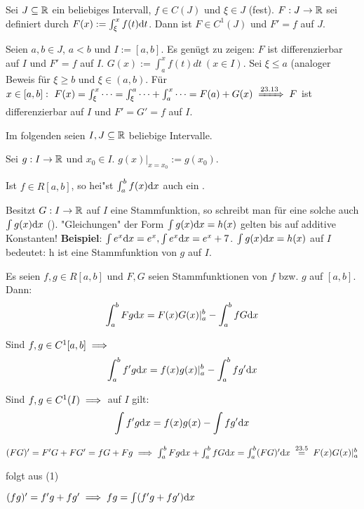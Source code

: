 \documentclass[a4paper,oneside,DIV15,BCOR12mm]{scrbook}
\begin{document}
\begin{satz}
Sei $J \subseteq \mathbb{R}$ ein beliebiges Intervall, $f \in C(J)$ und $\xi \in J$ (fest). $F:J\to\mathbb{R}$ sei definiert durch $F(x):=\int_{\xi}^xf(t)\text{d}t$. Dann ist $F\in C^1(J)$ und $F'=f$ auf $J$. 
\end{satz}


\begin{beweis}
Seien $a,b \in J$, $a<b$ und $I:=[a,b]$. Es genügt zu zeigen: $F$ ist differenzierbar auf $I$ und $F'=f$ auf $I$. $G(x):=\int_a^xf(t)dt\ (x\in I)$. Sei $\xi\le a$ (analoger Beweis für $\xi\ge b$ und $\xi \in (a,b)$. Für $x \in [a,b]:\ F(x)=\int_{\xi}^x\cdots = \int_{\xi}^a\cdots + \int_a^x\cdots=F(a)+G(x)\folgtnach{23.13} F$ ist differenzierbar auf $I$ und $F'=G'=f$ auf $I$.
\end{beweis}

\begin{definition}
Im folgenden seien $I,J\subseteq\mathbb{R}$ beliebige Intervalle.
\begin{liste}
\item Sei $g:I\to\mathbb{R}$ und $x_0\in I$. $g(x)|_{x=x_0}:=g(x_0).$
\item Ist $f \in R[a,b]$, so hei"st $\int_a^bf(x)\text{d}x$ auch ein .
\item Besitzt $G:I\to\mathbb{R}$ auf $I$ eine Stammfunktion, so schreibt man für eine solche auch $\int g(x)\text{d}x$ (). "Gleichungen" der Form $\int g(x)\text{d}x=h(x)$ gelten bis auf additive Konstanten! \textbf{Beispiel}: $\int e^x\text{d}x=e^x, \int e^x\text{d}x=e^x + 7$. $\int g(x)\text{d}x=h(x)$ auf $I$ bedeutet: h ist eine Stammfunktion von $g$ auf $I$.
\end{liste}
\end{definition}

\begin{satz}
\begin{liste}
\item Es seien $f,g \in R[a,b]$ und $F,G$ seien Stammfunktionen von $f$ bzw. $g$ auf $[a,b]$. Dann: $$\int_a^bFg\text{d}x=F(x)G(x)|_a^b-\int_a^bfG\text{d}x$$
\item Sind $f,g \in C^1[a,b] \implies$ $$\int_a^b f'g\text{d}x=f(x)g(x)|_a^b-\int_a^bfg'\text{d}x$$
\item Sind $f,g \in C^1(I) \implies$ auf $I$ gilt: $$\int f'g\text{d}x=f(x)g(x)-\int fg'\text{d}x$$
\end{liste}
\end{satz}

\begin{beweise}
\item $(FG)'=F'G+FG'=fG+Fg\folgt \int_a^bFg\dx+\int_a^bfG\dx=\int_a^b(FG)'\dx\gleichnach{23.5}F(x)G(x)|_a^b$
\item folgt aus (1)
\item $(fg)'=f'g+fg'\implies fg=\int(f'g+fg')\text{d}x$
\end{beweise}
\end{document}
